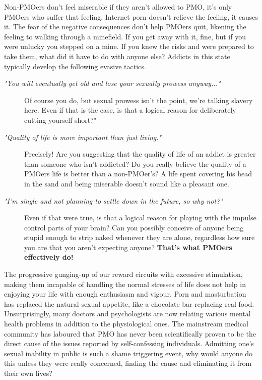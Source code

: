 \documentclass[easypeasy.tex]{subfiles}
\begin{document}
Non-PMOers don't feel miserable if they aren't allowed to PMO, it's only PMOers who suffer that feeling. Internet porn doesn't relieve the feeling, it causes it. The fear of the negative consequences don't help PMOers quit, likening the feeling to walking through a minefield. If you get away with it, fine, but if you were unlucky you stepped on a mine. If you knew the risks and were prepared to take them, what did it have to do with anyone else? Addicts in this state typically develop the following evasive tactics.
\begin{description}
  \item [\textit{"You will eventually get old and lose your sexually prowess anyway..."}] Of course you do, but sexual prowess isn't the point, we're talking slavery here. Even if that is the case, is that a logical reason for deliberately cutting yourself short?"

  \item  [ \textit{"Quality of life is more important than just living."}] Precisely! Are you suggesting that the quality of life of an addict is greater than someone who isn't addicted? Do you really believe the quality of a PMOers life is better than a non-PMOer's? A life spent covering his head in the sand and being miserable doesn't sound like a pleasant one.

  \item [\textit{"I'm single and not planning to settle down in the future, so why not?"}] Even if that were true, is that a logical reason for playing with the impulse control parts of your brain? Can you possibly conceive of anyone being stupid enough to strip naked whenever they are alone, regardless how sure you are that you aren't expecting anyone? \textbf{That's what PMOers effectively do!}
\end{description}

The progressive gunging-up of our reward circuits with excessive stimulation, making them incapable of handling the normal stresses of life does not help in enjoying your life with enough enthusiasm and vigour. Porn and masturbation has replaced the natural sexual appetite, like a chocolate bar replacing real food. Unsurprisingly, many doctors and psychologists are now relating various mental health problems in addition to the physiological ones. The mainstream medical community has laboured that PMO has never been scientifically proven to be the direct cause of the issues reported by self-confessing individuals. Admitting one's sexual inability in public is such a shame triggering event, why would anyone do this unless they were really concerned, finding the cause and eliminating it from their own lives?
\end{document}
